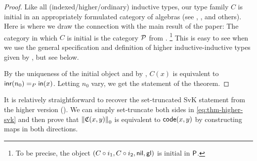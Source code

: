 \begin{proof}
Like all (indexed/higher/ordinary) inductive types,
our type family $C$ is initial in an
appropriately formulated category of algebras (see \citet{awodeyGamSoja_hoAlgs},
\cite{Coquand:2018:HIT:3209108.3209197}, and others).
Here is where we draw the connection with the main result of the paper:
The category in which $C$ is initial is
the category $\CatP$ from .%
\footnote{To be precise, the object $(C \circ i_1, C \circ i_2, \nil, \glconstr)$ is initial in $\PP$.}
This is easy to see when we use the general specification and definition of
higher inductive-inductive types given by \citet{kaposi_et_al:LIPIcs:2018:9190,AAhiits},
but see  below.

By the uniqueness of the initial object and by ,
$C(x)$ is equivalent to $\inr(n_0) =_P \inp(x)$.
Letting $n_0$ vary, we get the statement of the theorem.
\end{proof}

It is relatively straightforward to recover the set-truncated SvK statement
from the higher version ().
We can simply set-truncate both sides in \eqref{eq:thm-higher-svk} and then prove
that $\trunc 0 {\mathfrak C(x,y)}$ is equivalent to $\code(x,y)$ by constructing
maps in both directions.

